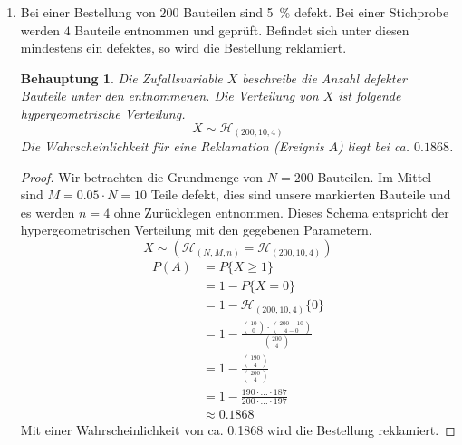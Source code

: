 \documentclass[a4paper]{scrartcl}
\newtheorem*{behaupt}{Behauptung}
\begin{document}
\begin{enumerate}[label=\bfseries\arabic*.]
    \item
        Bei einer Bestellung von $200$ Bauteilen sind \SI{5}{\percent} defekt.
        Bei einer Stichprobe werden $4$ Bauteile entnommen und geprüft.
        Befindet sich unter diesen mindestens ein defektes, so wird die
        Bestellung reklamiert.

    	\begin{behaupt}
            Die Zufallsvariable $X$ beschreibe die Anzahl defekter Bauteile
            unter den entnommenen.
            Die Verteilung von $X$ ist folgende hypergeometrische Verteilung.
            \begin{equation*}
                X \sim \mathcal{H}_{(200, 10, 4)}
            \end{equation*}
            Die Wahrscheinlichkeit für eine Reklamation (Ereignis $A$) liegt bei
            ca. $\num{0,1868}$.
    	\end{behaupt}
        \begin{proof}
            Wir betrachten die Grundmenge von $N = 200$ Bauteilen.
            Im Mittel sind $M = \num{0.05} \cdot N = 10$ Teile defekt, dies sind
            unsere markierten Bauteile und es werden $n = 4$ ohne Zurücklegen
            entnommen.
            Dieses Schema entspricht der hypergeometrischen Verteilung mit
            den gegebenen Parametern.
            \begin{equation*}
                X \sim (\mathcal{H}_{(N, M, n)} = \mathcal{H}_{(200, 10, 4)})
            \end{equation*}
            \begin{equation*}
                \begin{split}
                    P(A) &= P\{X \geq 1\} \\
                    &= 1 - P\{X = 0\} \\
                    &= 1 - \mathcal{H}_{(200, 10, 4)}\{0\} \\
                    &= 1 - \frac{\binom{10}{0} \cdot \binom{200 - 10}{4 - 0}}
                                {\binom{200}{4}} \\
                    &= 1 - \frac{\binom{190}{4}}{\binom{200}{4}} \\
                    &= 1 - \frac{190 \cdot \ldots \cdot 187}
                                {200 \cdot \ldots \cdot 197} \\
                    &\approx \num{0.1868}
                \end{split}
            \end{equation*}
            Mit einer Wahrscheinlichkeit von ca. \num{0,1868} wird die
            Bestellung reklamiert.
        \end{proof}
    	

\end{enumerate}
\end{document}
